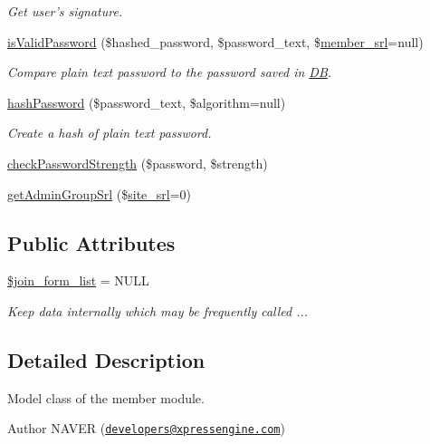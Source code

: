 \begin{DoxyCompactItemize}
\begin{DoxyCompactList}\small\item\em Get user's signature. \end{DoxyCompactList}\item 
\hyperlink{classmemberModel_a5d2727323d47e4304998311424bb4091}{is\-Valid\-Password} (\$hashed\-\_\-password, \$password\-\_\-text, \$\hyperlink{ko_8install_8php_aa61f9e08f0fe505094d26f8143f30bbd}{member\-\_\-srl}=null)
\begin{DoxyCompactList}\small\item\em Compare plain text password to the password saved in \hyperlink{classDB}{D\-B}. \end{DoxyCompactList}\item 
\hyperlink{classmemberModel_a0183c4c53c2eadc045ba27d82b94412a}{hash\-Password} (\$password\-\_\-text, \$algorithm=null)
\begin{DoxyCompactList}\small\item\em Create a hash of plain text password. \end{DoxyCompactList}\item 
\hyperlink{classmemberModel_a5970b2dcba76f9fc910cc3df7de19ac7}{check\-Password\-Strength} (\$password, \$strength)
\item 
\hyperlink{classmemberModel_ad8c1aafe9a4f461404b596ff6ad3e2ed}{get\-Admin\-Group\-Srl} (\$\hyperlink{ko_8install_8php_a8b1406b4ad1048041558dce6bfe89004}{site\-\_\-srl}=0)
\end{DoxyCompactItemize}
\subsection*{Public Attributes}
\begin{DoxyCompactItemize}
\item 
\hyperlink{classmemberModel_aa9b942e17ed74955c8700dd74d75d2b2}{\$join\-\_\-form\-\_\-list} = N\-U\-L\-L
\begin{DoxyCompactList}\small\item\em Keep data internally which may be frequently called ... \end{DoxyCompactList}\end{DoxyCompactItemize}


\subsection{Detailed Description}
Model class of the member module. 

\begin{DoxyAuthor}{Author}
N\-A\-V\-E\-R (\href{mailto:developers@xpressengine.com}{\tt developers@xpressengine.\-com}) 
\end{DoxyAuthor}


